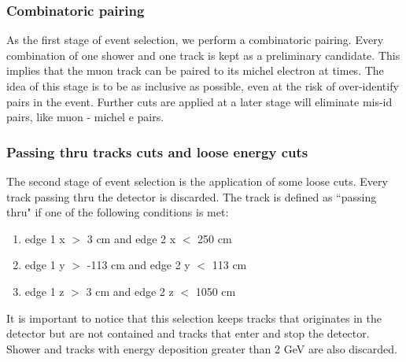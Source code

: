 \documentclass[a4paper, 10pt]{article}
\begin{document}
\subsubsection{Combinatoric pairing}
As the first stage of event selection, we perform a combinatoric pairing. Every combination of one shower and one track is kept as a preliminary candidate. This implies that the muon track can be paired to its michel electron at times. The idea of this stage is to be as inclusive as possible, even at the risk of over-identify pairs in the event. Further cuts are applied at a later stage will eliminate mis-id pairs, like muon - michel e pairs.

\subsubsection{Passing thru tracks cuts and loose energy cuts}
The second stage of event selection is the application of some  loose cuts. Every track passing thru the detector is discarded.
The track is defined as ``passing thru"  if one of the following conditions is met:
\begin{enumerate}[topsep=10pt,itemsep=-1ex,partopsep=10pt,parsep=1ex]
\item edge 1 x $>$ 3 cm       and  edge 2  x $<$  250 cm
\item edge 1 y $>$ -113 cm and  edge 2 y $<$ 113 cm
\item edge 1 z $>$ 3 cm       and  edge 2 z $<$ 1050 cm
\end{enumerate}
It is important to notice that this selection keeps tracks that originates in the detector but are not contained and tracks that enter and stop the detector. 
Shower and tracks with energy deposition greater than 2 GeV are also discarded. 
\end{document}
